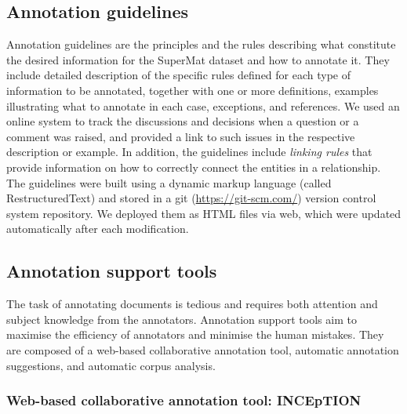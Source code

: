 \documentclass[fleqn,10pt]{wlscirep}
\begin{document}
\subsection*{Annotation guidelines}
\label{subsec:annotation-guidelines}
Annotation guidelines are the principles and the rules describing what constitute the desired information for the SuperMat dataset and how to annotate it. They include detailed description of the specific rules defined for each type of information to be annotated, together with one or more definitions, examples illustrating what to annotate in each case, exceptions, and references. We used an online system to track the discussions and decisions when a question or a comment was raised, and provided a link to such issues in the respective description or example. 
In addition, the guidelines include \textit{linking rules} that provide information on how to correctly connect the entities in a relationship. 
The guidelines were built using a dynamic markup language (called RestructuredText) and stored in a git (\url{https://git-scm.com/}) version control system repository. We deployed them as HTML files via web, which were updated automatically after each modification.

\subsection*{Annotation support tools}
\label{subsec:annotation-support-tool}
The task of annotating documents is tedious and requires both attention and subject knowledge from the annotators.
Annotation support tools aim to maximise the efficiency of annotators and minimise the human mistakes. 
They are composed of a web-based collaborative annotation tool, automatic annotation suggestions, and automatic corpus analysis. 

\subsubsection*{Web-based collaborative annotation tool: INCEpTION}
\label{subsec:annotation-tool}
\end{document}
